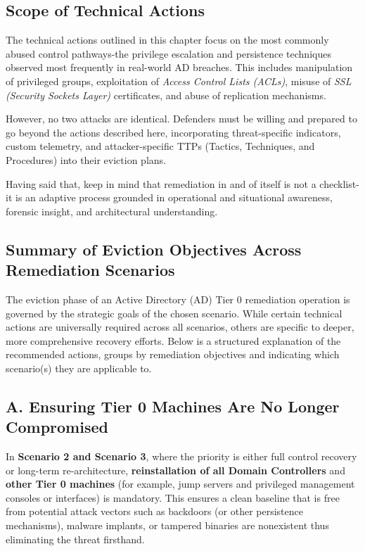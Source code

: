 \subsection{Scope of Technical Actions}
The technical actions outlined in this chapter focus on the most commonly abused control pathways-the privilege escalation and persistence techniques observed most frequently in real-world AD breaches. This includes manipulation of privileged groups, exploitation of \textit{Access Control Lists (ACLs)}, misuse of \textit{SSL (Security Sockets Layer)} certificates, and abuse of replication mechanisms.

However, no two attacks are identical. Defenders must be willing and prepared to go beyond the actions described here, incorporating threat-specific indicators, custom telemetry, and attacker-specific TTPs (Tactics, Techniques, and Procedures) into their eviction plans.

Having said that, keep in mind that remediation in and of itself is not a checklist-it is an adaptive process grounded in operational and situational awareness, forensic insight, and architectural understanding.

\subsection{Summary of Eviction Objectives Across Remediation Scenarios}
The eviction phase of an Active Directory (AD) Tier 0 remediation operation is governed by the strategic goals of the chosen scenario. While certain technical actions are universally required across all scenarios, others are specific to deeper, more comprehensive recovery efforts. Below is a structured explanation of the recommended actions, groups by remediation objectives and indicating which scenario(s) they are applicable to.

\subsection{A. Ensuring Tier 0 Machines Are No Longer Compromised}
In \textbf{Scenario 2 and Scenario 3}, where the priority is either full control recovery or long-term re-architecture, \textbf{reinstallation of all Domain Controllers} and \textbf{other Tier 0 machines} (for example, jump servers and privileged management consoles or interfaces) is mandatory. This ensures a clean baseline that is free from potential attack vectors such as backdoors (or other persistence mechanisms), malware implants, or tampered binaries are nonexistent thus eliminating the threat firsthand.

